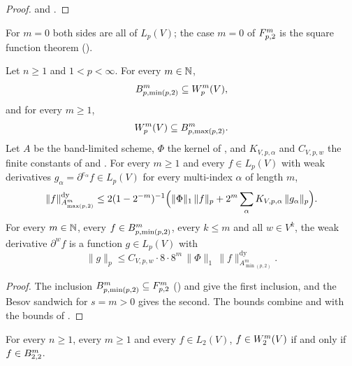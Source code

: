 \begin{proof}
\leanok
{} and .
\end{proof}

For $m = 0$ both sides are all of $L_p(V)$; the case $m = 0$ of $F^{m}_{p,2}$ is the square
function theorem ().

\begin{corollary}
\label{cor:sobolev-besov-sandwich}
\leanok
{}
Let $n \geq 1$ and $1 < p < \infty$. For every $m \in \mathbb{N}$,
\[
  B^{m}_{p,\min(p,2)} \subseteq W^{m}_{p}(V) ,
\]
and for every $m \geq 1$,
\[
  W^{m}_{p}(V) \subseteq B^{m}_{p,\max(p,2)} .
\]
Let $A$ be the band-limited scheme, $\Phi$ the kernel of , and
$K_{V,p,\alpha}$ and $C_{V,p,w}$ the finite constants of  and
. For every $m \geq 1$ and every $f \in L_p(V)$ with weak
derivatives $g_\alpha = \partial^{e_\alpha} f \in L_p(V)$ for every multi-index $\alpha$ of length
$m$,
\[
  \|f\|^{\mathrm{dy}}_{A^m_{\max(p,2)}} \leq 2 (1 - 2^{-m})^{-1}
  \Bigl( \|\Phi\|_1 \, \|f\|_p + 2^m \sum_\alpha K_{V,p,\alpha} \, \|g_\alpha\|_p \Bigr) .
\]
For every $m \in \mathbb{N}$, every $f \in B^{m}_{p,\min(p,2)}$, every $k \leq m$ and all
$w \in V^k$, the weak derivative $\partial^w f$ is a function $g \in L_p(V)$ with
\[
  \|g\|_p \leq C_{V,p,w} \cdot 8 \cdot 8^m \, \|\Phi\|_1 \, \|f\|^{\mathrm{dy}}_{A^m_{\min(p,2)}} .
\]
\end{corollary}

\begin{proof}
\leanok
The inclusion $B^{m}_{p,\min(p,2)} \subseteq F^{m}_{p,2}$
() and  give the first
inclusion, and the Besov sandwich for $s = m > 0$ gives the second. The bounds combine
 and  with the
bounds of .
\end{proof}

\begin{corollary}[$\Sob{m}{2} = \Besov{m}{2}{2}$]
\label{cor:sobolev-integer-two-besov}
\leanok
{}
For every $n \geq 1$, every $m \geq 1$ and every $f \in L_2(V)$, $f \in W^{m}_{2}(V)$ if and
only if $f \in B^{m}_{2,2}$.
\end{corollary}


